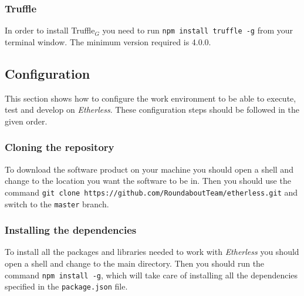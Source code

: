 \subsubsection{Truffle}
 In order to install Truffle$_{G}$ you need to run \texttt{npm install truffle -g} from your terminal window. The minimum version required is 4.0.0.
\subsection{Configuration}
This section shows how to configure the work environment to be able to execute, test and develop on \textit{Etherless}. These configuration steps should be followed in the given order.
\subsubsection{Cloning the repository}
To download the software product on your machine you should open a shell and change to the location you want the software to be in. Then you should use the command \texttt{git clone https://github.com/RoundaboutTeam/etherless.git} and switch to the \texttt{master} branch.
\subsubsection{Installing the dependencies}
To install all the packages and libraries needed to work with \textit{Etherless} you should open a shell and change to the main directory. Then you should run the command \texttt{npm install -g}, which will take care of installing all the dependencies specified in the \texttt{package.json} file.
